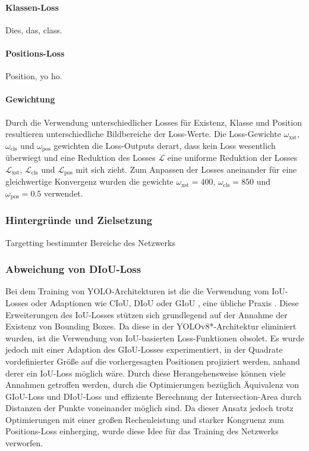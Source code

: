 \paragraph{Klassen-Loss}

Dies, das, class.

\todo{}

\paragraph{Positions-Loss}

Position, yo ho.

\todo{}

\paragraph{Gewichtung}

Durch die Verwendung unterschiedlicher Losses für Existenz, Klasse und Position resultieren unterschiedliche Bildbereiche der Loss-Werte. Die Loss-Gewichte $\omega_\text{xst}$, $\omega_\text{cls}$ und $\omega_\text{pos}$ gewichten die Loss-Outputs derart, dass kein Loss wesentlich überwiegt und eine Reduktion des Losses $\mathcal{L}$ eine uniforme Reduktion der Losses $\mathcal{L}_\text{xst}$, $\mathcal{L}_\text{cls}$ und $\mathcal{L}_\text{pos}$ mit sich zieht. Zum Anpassen der Losses aneinander für eine gleichwertige Konvergenz wurden die gewichte $\omega_\text{xst} = 400$, $\omega_\text{cls} = 850$ und $\omega_\text{pos} = 0.5$ verwendet.

\subsubsection{Hintergründe und Zielsetzung}

Targetting bestimmter Bereiche des Netzwerks

\todo{}

\subsubsection{Abweichung von DIoU-Loss}

Bei dem Training von YOLO-Architekturen ist die die Verwendung vom IoU-Losses oder Adaptionen wie CIoU, DIoU oder GIoU \cite{diou_losses}, eine übliche Praxis \cite{yolov1,yolov8_paper,yolo_training_giou}. Diese Erweiterungen des IoU-Losses stützen sich grundlegend auf der Annahme der Existenz von Bounding Boxes. Da diese in der YOLOv8*-Architektur eliminiert wurden, ist die Verwendung von IoU-basierten Loss-Funktionen obsolet. Es wurde jedoch mit einer Adaption des GIoU-Losses experimentiert, in der Quadrate vordefinierter Größe auf die vorhergesagten Positionen projiziert werden, anhand derer ein IoU-Loss möglich wäre. Durch diese Herangehensweise können viele Annahmen getroffen werden, durch die Optimierungen bezüglich Äquivalenz von GIoU-Loss und DIoU-Loss und effiziente Berechnung der Intersection-Area durch Distanzen der Punkte voneinander möglich sind. Da dieser Ansatz jedoch trotz Optimierungen mit einer großen Rechenleistung und starker Kongruenz zum Positions-Loss einherging, wurde diese Idee für das Training des Netzwerks verworfen.

